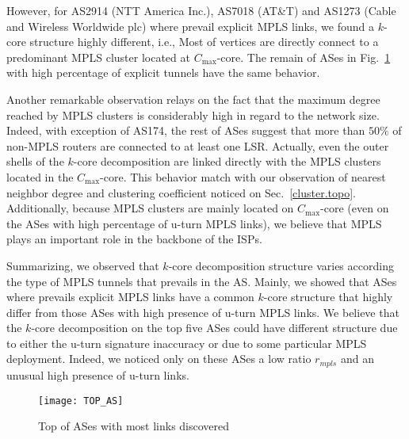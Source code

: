 However, for  AS2914 (NTT America Inc.), AS7018 (AT\&T) and AS1273 (Cable and
Wireless Worldwide plc) where prevail explicit MPLS links, we found a $k$-core
structure highly different, i.e., Most of vertices are directly connect to a
predominant MPLS cluster located at $C_{\max}$-core. The remain of  ASes in
Fig.~\ref{top_as} with high percentage of explicit tunnels have the same
behavior.

Another remarkable observation  relays on the fact that the maximum degree
reached by MPLS clusters is considerably high in regard to the network
size. Indeed, with exception of AS174, the rest of ASes suggest that more than
$50\%$ of non-MPLS routers are connected  to at least one LSR. Actually, even
the outer shells of the $k$-core decomposition are linked directly with the
MPLS clusters located in the $C_{\max}$-core. This behavior match with
our observation of nearest neighbor degree and clustering coefficient noticed on
Sec.~\ref{cluster.topo}. Additionally, because MPLS clusters are
mainly located on $C_{\max}$-core (even on the ASes with high percentage of
u-turn MPLS links), we believe that MPLS plays an important role in the
backbone of the ISPs.

Summarizing, we observed that  $k$-core decomposition structure varies according
the type of MPLS tunnels that prevails in the AS. Mainly, we showed that ASes
where prevails explicit MPLS links have a common $k$-core structure that highly
differ from those ASes with high presence of u-turn MPLS links. We believe that
the $k$-core decomposition  on the top five ASes could have different structure
due to either  the u-turn signature inaccuracy or due to some particular MPLS
deployment. Indeed, we noticed only on these ASes a low ratio $r_{mpls}$ and an
unusual  high presence of  u-turn links.


\begin{figure}[!htb]
  \begin{center}
    \texttt{[image: TOP\_AS]}
  \end{center}
  \caption{Top of ASes with most links discovered}
  \label{top_as}
\end{figure}

